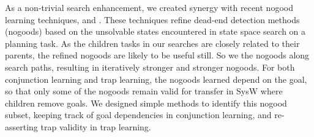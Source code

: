 As a non-trivial search enhancement, we created synergy with recent
nogood learning techniques, 
\cite{steinmetz:hoffmann:ai-17} and 
\cite{steinmetz:hoffmann:ijcai-17}. These techniques refine dead-end
detection methods (nogoods) based on the unsolvable states encountered
in state space search on a planning task. As the children tasks in our
searches are closely related to their parents, the refined nogoods are
likely to be useful still. So we  the nogoods along
search paths, resulting in iteratively stronger and stronger
nogoods. For both conjunction learning and trap learning, the nogoods
learned depend on the goal, so that only some of the nogoods remain
valid for transfer in SysW where children remove goals. We designed
simple methods to identify this nogood subset, keeping track of goal
dependencies in conjunction learning, and re-asserting trap validity
in trap learning.
%
%









